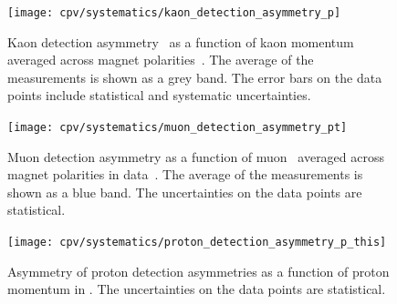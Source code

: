\begin{figure}
  \centering
  \texttt{[image: cpv/systematics/kaon\_detection\_asymmetry\_p]}
  \caption{%
    Kaon detection asymmetry \ADKpi\ as a function of kaon momentum averaged 
    across magnet polarities~\cite{Aaij:2014gsa}.
    The average of the measurements is shown as a grey band.
    The error bars on the data points include statistical and systematic 
    uncertainties.
  }
  \label{fig:cpv:syst:asym:kaon}
\end{figure}

\begin{table}
  \centering
  \caption{%
    Kaon detection asymmetries \ADKpi\ in bins of kaon 
    momentum~\cite{Aaij:2014gsa}.
  }
  \label{tab:cpv:syst:asym:kaon}
  
\end{table}

\begin{figure}
  \centering
  \texttt{[image: cpv/systematics/muon\_detection\_asymmetry\_pt]}
  \caption{%
    Muon detection asymmetry as a function of muon \pT\ averaged 
    across magnet polarities in  data~\cite{Stahl:2010261}.
    The average of the measurements is shown as a blue band.
    The uncertainties on the data points are statistical.
  }
  \label{fig:cpv:syst:asym:muon}
\end{figure}

\begin{table}
  \centering
  \caption{%
    Muon detection asymmetries in bins of muon \pT measured using  
    (2011) and \SI{8}{\TeV} (2012)~\cite{Stahl:2010261}.
  }
  \label{tab:cpv:syst:asym:muon}
  
\end{table}

\begin{table}
  \centering
  \caption{%
    Proton detection asymmetries measured using simulated data in bins of 
    proton momentum~\cite{Aaij:2015fea}.
  }
  \label{tab:cpv:syst:asym:proton}
  
\end{table}

\begin{figure}
  \centering
  \texttt{[image: cpv/systematics/proton\_detection\_asymmetry\_p\_this]}
  \caption{%
    Asymmetry of proton detection asymmetries as a function of proton momentum 
    in \si{\GeVc}.
    The uncertainties on the data points are statistical.
  }
  \label{fig:cpv:syst:asym:proton_this}
\end{figure}

